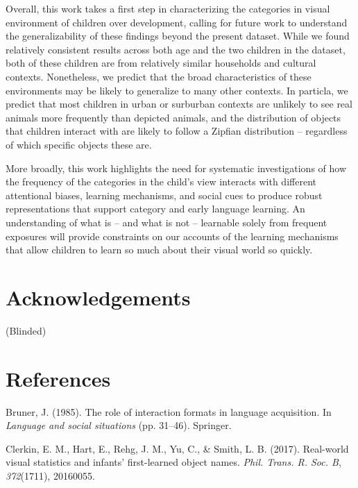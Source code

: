 \documentclass[10pt, letterpaper]{article}
\begin{document}
Overall, this work takes a first step in characterizing the categories
in visual environment of children over development, calling for future
work to understand the generalizability of these findings beyond the
present dataset. While we found relatively consistent results across
both age and the two children in the dataset, both of these children are
from relatively similar households and cultural contexts. Nonetheless,
we predict that the broad characteristics of these environments may be
likely to generalize to many other contexts. In particla, we predict
that most children in urban or surburban contexts are unlikely to see
real animals more frequently than depicted animals, and the distribution
of objects that children interact with are likely to follow a Zipfian
distribution -- regardless of which specific objects these are.

More broadly, this work highlights the need for systematic
investigations of how the frequency of the categories in the child's
view interacts with different attentional biases, learning mechanisms,
and social cues to produce robust representations that support category
and early language learning. An understanding of what is -- and what is
not -- learnable solely from frequent exposures will provide constraints
on our accounts of the learning mechanisms that allow children to learn
so much about their visual world so quickly.

\hypertarget{acknowledgements}{%
\section{Acknowledgements}\label{acknowledgements}}

(Blinded)

\hypertarget{references}{%
\section{References}\label{references}}

\setlength{\parindent}{-0.1in} 
\setlength{\leftskip}{0.125in}

\noindent

\hypertarget{refs}{}
\leavevmode\hypertarget{ref-bruner1985role}{}%
Bruner, J. (1985). The role of interaction formats in language
acquisition. In \emph{Language and social situations} (pp. 31--46).
Springer.

\leavevmode\hypertarget{ref-clerkin2017}{}%
Clerkin, E. M., Hart, E., Rehg, J. M., Yu, C., \& Smith, L. B. (2017).
Real-world visual statistics and infants' first-learned object names.
\emph{Phil. Trans. R. Soc. B}, \emph{372}(1711), 20160055.
\end{document}
